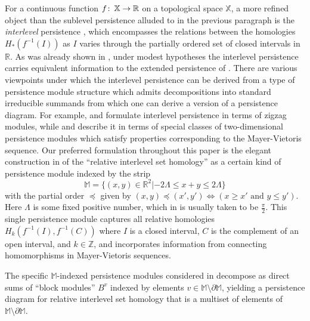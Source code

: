 \documentclass[11pt]{amsart}
\theoremstyle{definition}
\theoremstyle{remark}
\numberwithin{equation}{section}
\def\co{\colon\thinspace}
\def\R{\mathbb{R}}
\begin{document}
For a continuous function $f\co \mathbb{X}\to\R$ on a topological space $\mathbb{X}$, a more refined object than the sublevel persistence alluded to in the previous paragraph is the \emph{interlevel} persistence \cite{CDM}, which encompasses the relations between the homologies $H_*(f^{-1}(I))$ as $I$ varies through the partially ordered set of closed intervals in $\R$.   As was already shown in \cite{CDM}, under modest hypotheses the interlevel persistence carries equivalent information to the extended persistence of \cite{CEH09}.  There are various viewpoints under which the interlevel persistence can be derived from a type of persistence module structure which admits decompositions into standard irreducible summands from which one can derive a version of a persistence diagram.  For example, \cite{BEMP} and \cite{CDM} formulate interlevel persistence in terms of zigzag modules, while \cite{BGO} and \cite{BBF20} describe it in terms of special classes of two-dimensional persistence modules which satisfy  properties corresponding to the Mayer-Vietoris sequence.  Our preferred formulation throughout this paper is the elegant construction in \cite{BBF20} of the ``relative interlevel set homology'' as a certain kind of persistence module indexed by the strip \begin{equation} \label{mdef}\mathbb{M}=\{(x,y)\in\R^2|-2\Lambda\leq x+y\leq 2\Lambda\}\end{equation} with the partial order $\preceq$ given by $(x,y)\preceq (x',y')\Leftrightarrow \left(x\geq x' \mbox{ and }y\leq y'\right)$.  Here $\Lambda$ is some fixed positive number, which in \cite{BBF20} is usually taken to be $\frac{\pi}{2}$. This single persistence module captures all relative homologies $H_k(f^{-1}(I),f^{-1}(C))$ where $I$ is a closed interval, $C$ is the complement of an open interval, and $k\in \mathbb{Z}$, and incorporates information from connecting homomorphisms in Mayer-Vietoris sequences.  

The specific $\mathbb{M}$-indexed persistence modules considered in \cite{BBF20} decompose as direct sums of ``block modules'' $B^v$ indexed by elements  $v\in \mathbb{M}\setminus\partial\mathbb{M}$, yielding a persistence diagram for relative interlevel set homology that is a multiset of elements of $\mathbb{M}\setminus\partial\mathbb{M}$.
\end{document}
